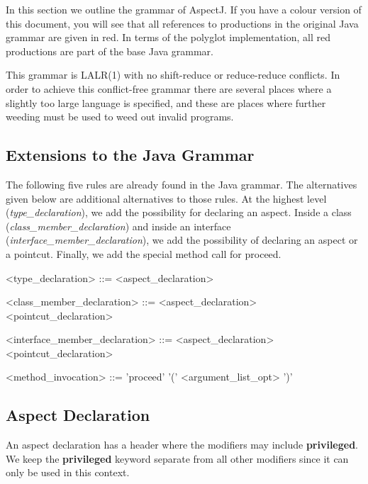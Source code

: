 In this section we outline the grammar of AspectJ.   If you have a colour
version of this document,  you will see that all references to
productions in the original Java grammar are given in red.    In terms of the
polyglot implementation, all red productions are part of the base Java grammar.

This grammar is LALR(1) with no shift-reduce or reduce-reduce conflicts.
In order to achieve this conflict-free grammar there are several places
where a slightly too large language is specified, and these are places
where further weeding must be used to weed out invalid programs.

\subsection{Extensions to the Java Grammar}

The following five rules are already found in the Java grammar.  The
alternatives given below are additional alternatives to those rules.    At the
highest level ({\em type\_declaration}), we add the possibility for declaring
an aspect.    Inside a class ({\em class\_member\_declaration}) and inside an
interface ({\em interface\_member\_declaration}), we
add the possibility of declaring an aspect or a pointcut.   Finally, we add the
special method call for proceed. 

\begin{minipage}{6in}
\begin{grammar}
\begin{blue}
<{\red type_declaration}> ::= <aspect_declaration>

<{\red class_member_declaration}> ::= <aspect_declaration>
                            \alt      <pointcut_declaration>

<{\red interface_member_declaration}> ::= <aspect_declaration>
                                 \alt     <pointcut_declaration>

<{\red method_invocation}> ::= 'proceed' '(' {\red <argument_list_opt>} ')'

\end{blue}
\end{grammar}
\end{minipage}

\subsection{Aspect Declaration}

An aspect declaration has a header where the modifiers may include
{\bf privileged}.   We keep the {\bf privileged} keyword
separate from all other modifiers since it can only be used in this
context.   

